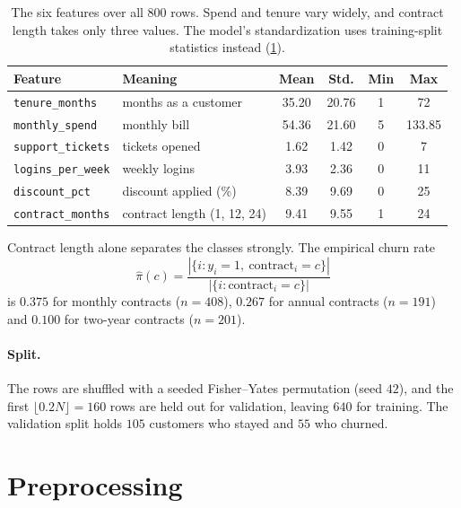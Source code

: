 \documentclass[11pt]{article}
\newcommand{\code}[1]{\texttt{#1}}
\begin{document}
\begin{table}[htbp]
\centering
\caption{The six features over all $800$ rows. Spend and tenure vary widely,
and contract length takes only three values. The model's standardization uses
training-split statistics instead (\cref{sec:prep}).}
\label{tab:features}
\begin{tabular}{l l S[table-format=2.2] S[table-format=2.2] S[table-format=1.0] S[table-format=3.2]}
\toprule
Feature & Meaning & {Mean} & {Std.} & {Min} & {Max} \\
\midrule
\code{tenure\_months}   & months as a customer        & 35.20 & 20.76 & 1 & 72 \\
\code{monthly\_spend}   & monthly bill                & 54.36 & 21.60 & 5 & 133.85 \\
\code{support\_tickets} & tickets opened              & 1.62  & 1.42  & 0 & 7 \\
\code{logins\_per\_week}& weekly logins               & 3.93  & 2.36  & 0 & 11 \\
\code{discount\_pct}    & discount applied (\%)       & 8.39  & 9.69  & 0 & 25 \\
\code{contract\_months} & contract length (1, 12, 24) & 9.41  & 9.55  & 1 & 24 \\
\bottomrule
\end{tabular}
\end{table}

Contract length alone separates the classes strongly. The empirical churn rate
\begin{equation}
  \hat\pi(c) = \frac{|\{i : y_i = 1,\ \text{contract}_i = c\}|}{|\{i : \text{contract}_i = c\}|}
\end{equation}
is $0.375$ for monthly contracts ($n = 408$), $0.267$ for annual contracts
($n = 191$) and $0.100$ for two-year contracts ($n = 201$).

\paragraph{Split.} The rows are shuffled with a seeded Fisher--Yates
permutation (seed $42$), and the first $\lfloor 0.2 N \rfloor = 160$ rows are
held out for validation, leaving $640$ for training. The validation split holds
$105$ customers who stayed and $55$ who churned.

\section{Preprocessing}\label{sec:prep}
\end{document}

